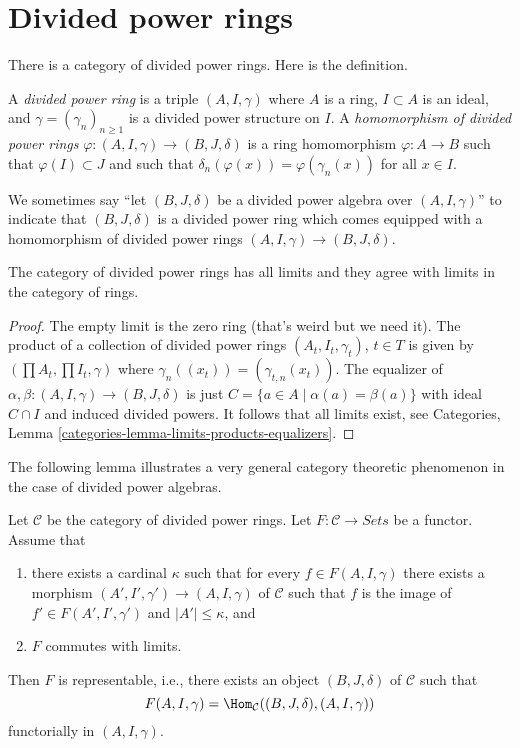 \section{Divided power rings}
\label{section-divided-power-rings}

\noindent
There is a category of divided power rings.
Here is the definition.

\begin{definition}
\label{definition-divided-power-ring}
A {\it divided power ring} is a triple $(A, I, \gamma)$ where
$A$ is a ring, $I \subset A$ is an ideal, and $\gamma = (\gamma_n)_{n \geq 1}$
is a divided power structure on $I$.
A {\it homomorphism of divided power rings}
$\varphi : (A, I, \gamma) \to (B, J, \delta)$ is a ring homomorphism
$\varphi : A \to B$ such that $\varphi(I) \subset J$ and such that
$\delta_n(\varphi(x)) = \varphi(\gamma_n(x))$ for all $x \in I$.
\end{definition}

\noindent
We sometimes say ``let $(B, J, \delta)$ be a divided power algebra over
$(A, I, \gamma)$'' to indicate that $(B, J, \delta)$ is a divided power ring
which comes equipped with a homomorphism of divided power rings
$(A, I, \gamma) \to (B, J, \delta)$.

\begin{lemma}
\label{lemma-limits}
The category of divided power rings has all limits and they agree with
limits in the category of rings.
\end{lemma}

\begin{proof}
The empty limit is the zero ring (that's weird but we need it).
The product of a collection of divided power rings $(A_t, I_t, \gamma_t)$,
$t \in T$ is given by $(\prod A_t, \prod I_t, \gamma)$ where
$\gamma_n((x_t)) = (\gamma_{t, n}(x_t))$.
The equalizer of $\alpha, \beta : (A, I, \gamma) \to (B, J, \delta)$
is just $C = \{a \in A \mid \alpha(a) = \beta(a)\}$ with ideal $C \cap I$
and induced divided powers. It follows that all limits exist, see
Categories, Lemma \ref{categories-lemma-limits-products-equalizers}.
\end{proof}

\noindent
The following lemma illustrates a very general category theoretic
phenomenon in the case of divided power algebras.

\begin{lemma}
\label{lemma-a-version-of-brown}
Let $\mathcal{C}$ be the category of divided power rings. Let
$F : \mathcal{C} \to \textit{Sets}$ be a functor.
Assume that
\begin{enumerate}
\item there exists a cardinal $\kappa$ such that for every
$f \in F(A, I, \gamma)$ there exists a morphism
$(A', I', \gamma') \to (A, I, \gamma)$ of $\mathcal{C}$ such that $f$
is the image of $f' \in F(A', I', \gamma')$ and $|A'| \leq \kappa$, and
\item $F$ commutes with limits.
\end{enumerate}
Then $F$ is representable, i.e., there exists an object $(B, J, \delta)$
of $\mathcal{C}$ such that
$$
F(A, I, \gamma) = \Hom_\mathcal{C}((B, J, \delta), (A, I, \gamma))
$$
functorially in $(A, I, \gamma)$.
\end{lemma}


